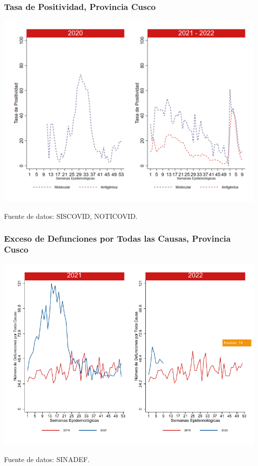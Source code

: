 \documentclass[xcolor=table]{beamer}
\begin{document}
\begin{frame}
	\frametitle{Tasa de Positividad, Provincia Cusco}
	\vspace{-.5cm}
	\begin{center}
		\includegraphics[width=0.8\linewidth, trim={0cm .5cm 0cm 0.2cm},clip]{../figuras/positividad_20_21_7.png}
	\end{center}
	{\tiny Fuente de datos: SISCOVID, NOTICOVID.}
\end{frame}

\begin{frame}
	\frametitle{Exceso de Defunciones por Todas las Causas, Provincia Cusco}
	\vspace{-.5cm}
	\begin{center}
		\includegraphics[width=0.8\linewidth, trim={0cm .5cm 0cm 0.2cm},clip]{../figuras/exceso_7.pdf}
	\end{center}
	{\tiny Fuente de datos: SINADEF.}
	
	\hyperlink{indicadores_provinciales}{}
\end{frame}
\end{document}
